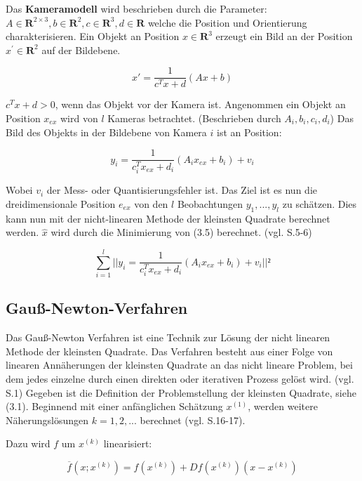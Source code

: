 Das \textbf{Kameramodell} wird beschrieben durch die Parameter: $A \in  \textbf{R}^{2\times 3}, b \in \textbf{R}^2, c \in  \textbf{R}^3, d \in \textbf{R}$ welche die Position und Orientierung charakterisieren. Ein Objekt an Position $x \in \textbf{R}^3 $ erzeugt ein Bild an der Position $x^\prime \in \textbf{R}^2$ auf der Bildebene.

\begin{equation}
x \prime = \frac{1}{c^Tx+d} (Ax +b )
\end{equation}

$c^Tx+d >0$, wenn das Objekt vor der Kamera ist. Angenommen ein Objekt an Position $x_{ex}$ wird von $l$ Kameras betrachtet. (Beschrieben durch $A_i,b_i,c_i,d_i$) Das Bild des Objekts in der Bildebene von Kamera $i$ ist an Position:

\begin{equation}
y_i = \frac{1}{c_i^T x_{ex}+d_i}(A_i x_{ex} + b_i) + v_i
\end{equation}

Wobei $v_i$ der Mess- oder Quantisierungsfehler ist. Das Ziel ist es nun die dreidimensionale Position $e_{ex}$ von den $l$ Beobachtungen $y_1,...,y_l$ zu schätzen. Dies kann nun mit der nicht-linearen Methode der kleinsten Quadrate berechnet werden. $\hat x$ wird durch die Minimierung von (3.5) berechnet. (vgl. \cite{nonlinear_1} S.5-6)

\begin{equation}
\sum_{i=1}^l || y_i = \frac{1}{c_i^T x_{ex}+d_i}(A_i x_{ex} + b_i) + v_i||²
\end{equation}

\subsection{Gauß-Newton-Verfahren}

Das Gauß-Newton Verfahren ist eine Technik zur Lösung der nicht linearen Methode der kleinsten Quadrate. Das Verfahren besteht aus einer Folge von linearen Annäherungen der kleinsten Quadrate an das nicht lineare Problem, bei dem jedes einzelne durch einen direkten oder iterativen Prozess gelöst wird. (vgl. \cite{approx_gn} S.1) Gegeben ist die Definition der Problemstellung der kleinsten Quadrate, siehe (3.1). Beginnend mit einer anfänglichen Schätzung $x^{(1)}$, werden weitere Näherungslösungen $k = 1,2,...$ berechnet (vgl. \cite{nonlinear_1} S.16-17).

Dazu wird $f$ um $x^{(k)}$ linearisiert:

\begin{equation}
\overline{f}(x;x^{(k)}) = f(x^{(k)})+Df(x^{(k)})(x-x^{(k)})
\end{equation}

